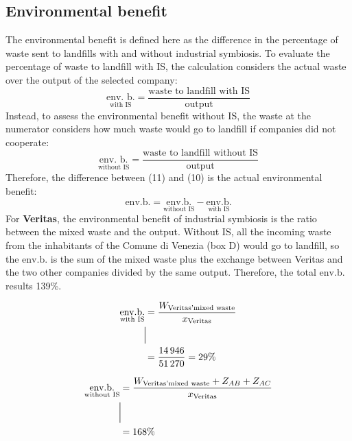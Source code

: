 \subsection{Environmental benefit}
The environmental benefit is defined here as the difference in the percentage of waste sent to landfills with and without industrial symbiosis. To evaluate the percentage of waste to landfill with IS, the calculation considers the actual waste over the output of the selected company: 
\begin{equation}
   \underset{\text{with IS}}{\text{env. b.}} = \frac{\text{waste to landfill with IS}}{\text{output}}
\end{equation}
Instead, to assess the environmental benefit without IS, the waste at the numerator considers how much waste would go to landfill if companies did not cooperate: 
\begin{equation}
    \underset{\text{without IS}}{\text{env. b.}} = \frac{\text{waste to landfill without IS}}{\text{output}}
\end{equation}
Therefore, the difference between (11) and (10) is the actual environmental benefit:
\begin{equation}
    \text{env.b.} = \underset{\text{without IS}}{\text{env.b.}} - \underset{\text{with IS}}{\text{env.b.}} 
\end{equation}
For \textbf{Veritas}, the environmental benefit of industrial symbiosis is the ratio between the mixed waste and the output. Without IS, all the incoming waste from the inhabitants of the Comune di Venezia (box D) would go to landfill, so the $ \text{env.b.}$ is the sum of the mixed waste plus the exchange between Veritas and the two other companies divided by the same output. Therefore, the total  $ \text{env.b.}$ results 139\%.
\begin{center}
\begin{minipage}{0.48\textwidth}
\begin{align*}
\underset{\text{with IS}}{\text{env.b.}} &= \frac{W_{\text{Veritas'mixed waste}}}{x_{\text{Veritas}}} \\
&\rule[-1.5ex]{0.5pt}{4ex} \\ %
&= \frac{14\,946}{51\,270} = 29\%
\end{align*}
\end{minipage}
\hfill %
\begin{minipage}{0.48\textwidth}
\begin{align*}
\underset{\text{without IS}}{\text{env.b.}} &= \frac{W_{\text{Veritas'mixed waste}} + Z_{AB} + Z_{AC}}{x_{\text{Veritas}}} \\
&\rule[-1.5ex]{0.5pt}{5ex} \\ %
&= 168\%
\end{align*}
\end{minipage}
\end{center}

